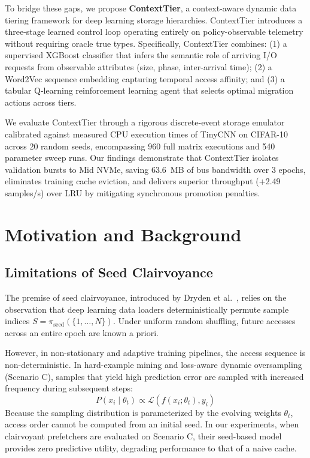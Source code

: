 \documentclass[conference]{IEEEtran}
\begin{document}
To bridge these gaps, we propose \textbf{ContextTier}, a context-aware dynamic data tiering framework for deep learning storage hierarchies. ContextTier introduces a three-stage learned control loop operating entirely on policy-observable telemetry without requiring oracle true types. Specifically, ContextTier combines: (1) a supervised XGBoost classifier that infers the semantic role of arriving I/O requests from observable attributes (size, phase, inter-arrival time); (2) a Word2Vec sequence embedding capturing temporal access affinity; and (3) a tabular Q-learning reinforcement learning agent that selects optimal migration actions across tiers.

We evaluate ContextTier through a rigorous discrete-event storage emulator calibrated against measured CPU execution times of TinyCNN on CIFAR-10 across 20 random seeds, encompassing 960 full matrix executions and 540 parameter sweep runs. Our findings demonstrate that ContextTier isolates validation bursts to Mid NVMe, saving 63.6~MB of bus bandwidth over 3 epochs, eliminates training cache eviction, and delivers superior throughput (+2.49 samples/s) over LRU by mitigating synchronous promotion penalties.

\section{Motivation and Background}
\label{sec:motivation}

\subsection{Limitations of Seed Clairvoyance}
The premise of seed clairvoyance, introduced by Dryden et al.~\cite{dryden2021clairvoyant}, relies on the observation that deep learning data loaders deterministically permute sample indices $S = \pi_{\text{seed}}(\{1, \dots, N\})$. Under uniform random shuffling, future accesses across an entire epoch are known a priori.

However, in non-stationary and adaptive training pipelines, the access sequence is non-deterministic. In hard-example mining and loss-aware dynamic oversampling (Scenario C), samples that yield high prediction error are sampled with increased frequency during subsequent steps:
\begin{equation}
P(x_i \mid \theta_t) \propto \mathcal{L}(f(x_i; \theta_t), y_i)
\end{equation}
Because the sampling distribution is parameterized by the evolving weights $\theta_t$, access order cannot be computed from an initial seed. In our experiments, when clairvoyant prefetchers are evaluated on Scenario C, their seed-based model provides zero predictive utility, degrading performance to that of a naive cache.
\end{document}
